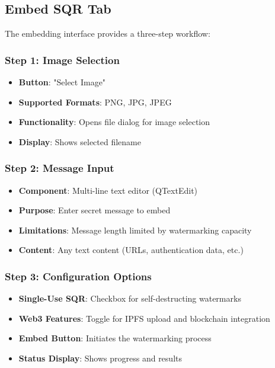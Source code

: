\documentclass[12pt,a4paper]{article}
\begin{document}
\subsection{Embed SQR Tab}

The embedding interface provides a three-step workflow:

\subsubsection{Step 1: Image Selection}
\begin{itemize}
    \item \textbf{Button}: "Select Image"
    \item \textbf{Supported Formats}: PNG, JPG, JPEG
    \item \textbf{Functionality}: Opens file dialog for image selection
    \item \textbf{Display}: Shows selected filename
\end{itemize}

\subsubsection{Step 2: Message Input}
\begin{itemize}
    \item \textbf{Component}: Multi-line text editor (QTextEdit)
    \item \textbf{Purpose}: Enter secret message to embed
    \item \textbf{Limitations}: Message length limited by watermarking capacity
    \item \textbf{Content}: Any text content (URLs, authentication data, etc.)
\end{itemize}

\subsubsection{Step 3: Configuration Options}
\begin{itemize}
    \item \textbf{Single-Use SQR}: Checkbox for self-destructing watermarks
    \item \textbf{Web3 Features}: Toggle for IPFS upload and blockchain integration
    \item \textbf{Embed Button}: Initiates the watermarking process
    \item \textbf{Status Display}: Shows progress and results
\end{itemize}
\end{document}
